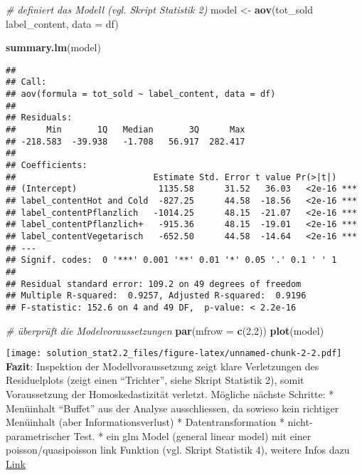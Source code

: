 \documentclass[]{article}
\newenvironment{Shaded}{\begin{snugshade}}{\end{snugshade}}
\newcommand{\CommentTok}[1]{\textcolor[rgb]{0.56,0.35,0.01}{\textit{#1}}}
\newcommand{\DataTypeTok}[1]{\textcolor[rgb]{0.13,0.29,0.53}{#1}}
\newcommand{\DecValTok}[1]{\textcolor[rgb]{0.00,0.00,0.81}{#1}}
\newcommand{\KeywordTok}[1]{\textcolor[rgb]{0.13,0.29,0.53}{\textbf{#1}}}
\newcommand{\NormalTok}[1]{#1}
\newcommand{\OperatorTok}[1]{\textcolor[rgb]{0.81,0.36,0.00}{\textbf{#1}}}
\newcommand{\StringTok}[1]{\textcolor[rgb]{0.31,0.60,0.02}{#1}}
\begin{document}
\begin{Shaded}
\begin{Highlighting}[]
\CommentTok{# definiert das Modell (vgl. Skript Statistik 2)}
\NormalTok{model <-}\StringTok{ }\KeywordTok{aov}\NormalTok{(tot_sold }\OperatorTok{~}\StringTok{ }\NormalTok{label_content, }\DataTypeTok{data =}\NormalTok{ df)}

\KeywordTok{summary.lm}\NormalTok{(model)}
\end{Highlighting}
\end{Shaded}

\begin{verbatim}
## 
## Call:
## aov(formula = tot_sold ~ label_content, data = df)
## 
## Residuals:
##      Min       1Q   Median       3Q      Max 
## -218.583  -39.938   -1.708   56.917  282.417 
## 
## Coefficients:
##                           Estimate Std. Error t value Pr(>|t|)    
## (Intercept)                1135.58      31.52   36.03   <2e-16 ***
## label_contentHot and Cold  -827.25      44.58  -18.56   <2e-16 ***
## label_contentPflanzlich   -1014.25      48.15  -21.07   <2e-16 ***
## label_contentPflanzlich+   -915.36      48.15  -19.01   <2e-16 ***
## label_contentVegetarisch   -652.50      44.58  -14.64   <2e-16 ***
## ---
## Signif. codes:  0 '***' 0.001 '**' 0.01 '*' 0.05 '.' 0.1 ' ' 1
## 
## Residual standard error: 109.2 on 49 degrees of freedom
## Multiple R-squared:  0.9257, Adjusted R-squared:  0.9196 
## F-statistic: 152.6 on 4 and 49 DF,  p-value: < 2.2e-16
\end{verbatim}

\begin{Shaded}
\begin{Highlighting}[]
\CommentTok{# überprüft die Modelvoraussetzungen}
\KeywordTok{par}\NormalTok{(}\DataTypeTok{mfrow =} \KeywordTok{c}\NormalTok{(}\DecValTok{2}\NormalTok{,}\DecValTok{2}\NormalTok{))}
\KeywordTok{plot}\NormalTok{(model)}
\end{Highlighting}
\end{Shaded}

\texttt{[image: solution\_stat2.2\_files/figure-latex/unnamed-chunk-2-2.pdf]}
\\
{\textbf{Fazit}: Inspektion der Modellvoraussetzung zeigt klare
Verletzungen des Residuelplots (zeigt einen ``Trichter'', siehe Skript
Statistik 2), somit Voraussetzung der Homoskedastizität verletzt.
Mögliche nächste Schritte: * Menüinhalt ``Buffet'' aus der Analyse
ausschliessen, da sowieso kein richtiger Menüinhalt (aber
Informationsverlust) * Datentransformation * nicht-parametrischer Test.}
* ein glm Model (general linear model) mit einer poisson/quasipoisson
link Funktion (vgl. Skript Statistik 4), weitere Infos dazu
\href{https://www.ncbi.nlm.nih.gov/pmc/articles/PMC5869353/}{Link}
\end{document}
